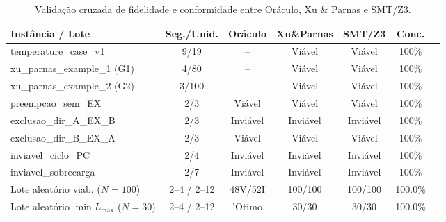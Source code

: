\begin{table}[t]
\centering
\caption{Valida\c{c}\~ao cruzada de fidelidade e conformidade entre Or\'aculo, Xu \& Parnas e SMT/Z3.}
\label{tab:validacao_cruzada}
\scriptsize
\begin{tabular}{lcccccc}
\hline
\textbf{Inst\^ancia / Lote} & \textbf{Seg./Unid.} & \textbf{Or\'aculo} & \textbf{Xu\&Parnas} & \textbf{SMT/Z3} & \textbf{Conc.} \\
\hline
temperature\_case\_v1 & 9/19 & -- & Vi\'avel & Vi\'avel & 100\% \\
xu\_parnas\_example\_1 (G1) & 4/80 & -- & Vi\'avel & Vi\'avel & 100\% \\
xu\_parnas\_example\_2 (G2) & 3/100 & -- & Vi\'avel & Vi\'avel & 100\% \\
preempcao\_sem\_EX & 2/3 & Vi\'avel & Vi\'avel & Vi\'avel & 100\% \\
exclusao\_dir\_A\_EX\_B & 2/3 & Invi\'avel & Invi\'avel & Invi\'avel & 100\% \\
exclusao\_dir\_B\_EX\_A & 2/3 & Vi\'avel & Vi\'avel & Vi\'avel & 100\% \\
inviavel\_ciclo\_PC & 2/4 & Invi\'avel & Invi\'avel & Invi\'avel & 100\% \\
inviavel\_sobrecarga & 2/7 & Invi\'avel & Invi\'avel & Invi\'avel & 100\% \\
\hline
Lote aleat\'orio viab. ($N=100$) & 2--4 / 2--12 & 48V/52I & 100/100 & 100/100 & 100.0\% \\
Lote aleat\'orio $\min L_{\max}$ ($N=30$) & 2--4 / 2--12 & 'Otimo & 30/30 & 30/30 & 100.0\% \\
\hline
\end{tabular}
\end{table}
